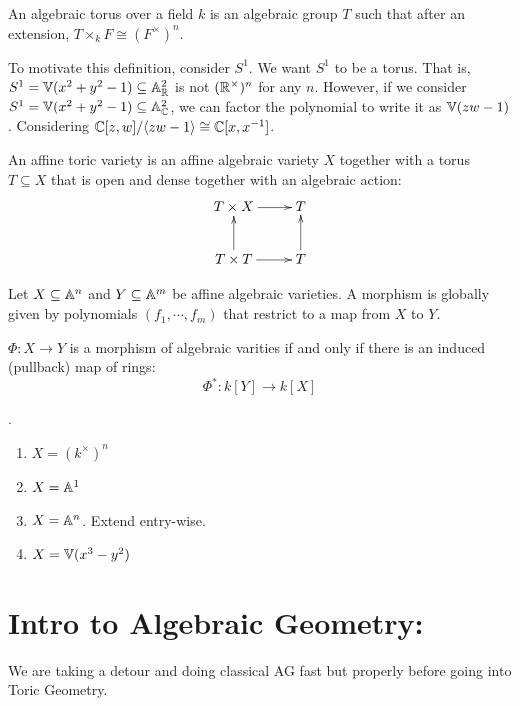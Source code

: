 \documentclass[12pt]{amsart}
\begin{document}
\begin{definition}
    An algebraic torus over a field $k$ is an algebraic group $T$ such that after an extension, $T \times_k F \cong (F^\times)^n$. 
\end{definition}

\begin{remark}
    To motivate this definition, consider $S^1$. We want $S^1$ to be a torus. That is, $S^1 = \mathbb V(x^2+y^2-1) \subseteq \mathbb A^2_\mathbb R$ is not $(\mathbb R^\times)^n$ for any $n$. However, if we consider $S^1 = \mathbb V(x^2+y^2-1) \subseteq \mathbb A^2_\mathbb C$, we can factor the polynomial to write it as $\mathbb V(zw-1)$. Considering $\mathbb C[z,w]/\langle zw-1\rangle \cong \mathbb C[x, x^{-1}]$. 
\end{remark}

\begin{definition}
    An affine toric variety is an affine algebraic variety $X$ together with a torus $T \subseteq X$ that is open and dense together with an algebraic action: 
    \[ \xymatrix{ T \times X \ar[r] & T \\ T \times T \ar[u] \ar[r] & T \ar[u] } \]
\end{definition}

\begin{definition}
    Let $X \subseteq \mathbb A^n$ and $Y \subseteq \mathbb A^m$ be affine algebraic varieties. A morphism is globally given by polynomials $(f_1, \cdots, f_m)$ that restrict to a map from $X$ to $Y$.
\end{definition}

\begin{lemma}
    $\Phi: X \to Y$ is a morphism of algebraic varities if and only if there is an induced (pullback) map of rings: 
    \[ \Phi^*: k[Y] \to k[X]\]
\end{lemma}

\begin{example}
    .
    \begin{enumerate}
        \item $X = (k^\times)^n$
        \item $X = \mathbb A^1$
        \item $X = \mathbb A^n$. Extend entry-wise. 
        \item $X = \mathbb V(x^3-y^2)$
    \end{enumerate}
\end{example}


\section{Intro to Algebraic Geometry:}
We are taking a detour and doing classical AG fast but properly before going into Toric Geometry. 
\end{document}
